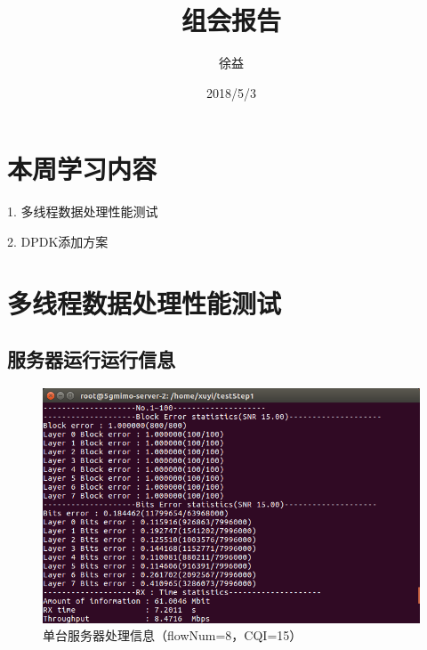 \documentclass{article}
\title{组会报告}
\author{徐益}
\date{2018/5/3}
\begin{document}
	
\maketitle


\section{本周学习内容}

1. 多线程数据处理性能测试

2. DPDK添加方案

\section{多线程数据处理性能测试}

\subsection{服务器运行运行信息}
\begin{figure}[H]
	\centering
	\includegraphics[width = .8\textwidth]{result_server.png}
	\caption{单台服务器处理信息（flowNum=8，CQI=15）}
\end{figure}
\end{document}

